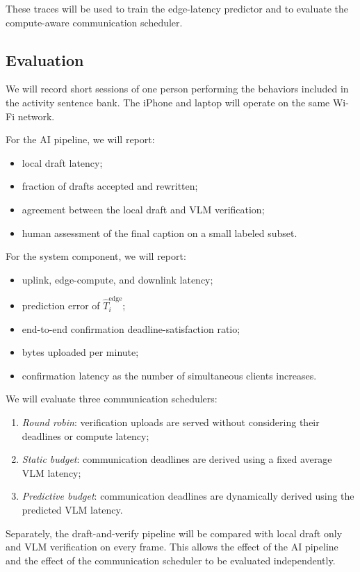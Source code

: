 These traces will be used to train the edge-latency predictor and to evaluate
the compute-aware communication scheduler.

\subsection{Evaluation}

We will record short sessions of one person performing the behaviors included
in the activity sentence bank. The iPhone and laptop will operate on the same
Wi-Fi network.

For the AI pipeline, we will report:
\begin{itemize}
\item local draft latency;
\item fraction of drafts accepted and rewritten;
\item agreement between the local draft and VLM verification;
\item human assessment of the final caption on a small labeled subset.
\end{itemize}

For the system component, we will report:
\begin{itemize}
\item uplink, edge-compute, and downlink latency;
\item prediction error of $\hat T_i^{\mathrm{edge}}$;
\item end-to-end confirmation deadline-satisfaction ratio;
\item bytes uploaded per minute;
\item confirmation latency as the number of simultaneous clients increases.
\end{itemize}

We will evaluate three communication schedulers:
\begin{enumerate}
\item \emph{Round robin}: verification uploads are served without considering
their deadlines or compute latency;
\item \emph{Static budget}: communication deadlines are derived using a fixed
average VLM latency;
\item \emph{Predictive budget}: communication deadlines are dynamically
derived using the predicted VLM latency.
\end{enumerate}

Separately, the draft-and-verify pipeline will be compared with local draft
only and VLM verification on every frame. This allows the effect of the AI
pipeline and the effect of the communication scheduler to be evaluated
independently.

